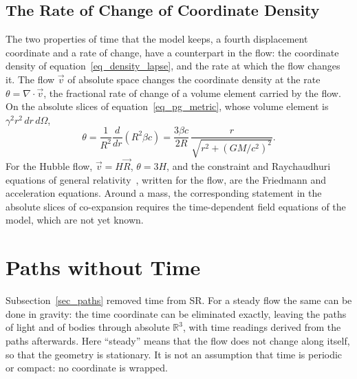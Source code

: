 \documentclass{iopjournal}
\begin{document}
\subsection{The Rate of Change of Coordinate Density}\label{sec_coordinate_density}

The two properties of time that the model keeps, a fourth displacement coordinate and a rate of change, have a counterpart in the flow: the coordinate density of equation~\eqref{eq_density_lapse}, and the rate at which the flow changes it. The flow $\vec v$ of absolute space changes the coordinate density at the rate $\theta=\nabla\cdot\vec v$, the fractional rate of change of a volume element carried by the flow. On the absolute slices of equation~\eqref{eq_pg_metric}, whose volume element is $\gamma^2r^2\,dr\,d\Omega$,
\begin{equation}\label{eq_theta_mass}
    \theta=\frac{1}{R^2}\frac{d}{dr}\left(R^2\beta c\right)=\frac{3\beta c}{2R}\,\frac{r}{\sqrt{r^2+(GM/c^2)^2}} .
\end{equation}
For the Hubble flow, $\vec v=H\vec R$, $\theta=3H$, and the constraint and Raychaudhuri equations of general relativity~\cite{Raychaudhuri1955}, written for the flow, are the Friedmann and acceleration equations. Around a mass, the corresponding statement in the absolute slices of co-expansion requires the time-dependent field equations of the model, which are not yet known.
\section{Paths without Time}\label{sec_time_elimination}

Subsection~\ref{sec_paths} removed time from SR. For a steady flow the same can be done in gravity: the time coordinate can be eliminated exactly, leaving the paths of light and of bodies through absolute $\mathbb{R}^3$, with time readings derived from the paths afterwards. Here ``steady'' means that the flow does not change along itself, so that the geometry is stationary. It is not an assumption that time is periodic or compact: no coordinate is wrapped.
\end{document}
